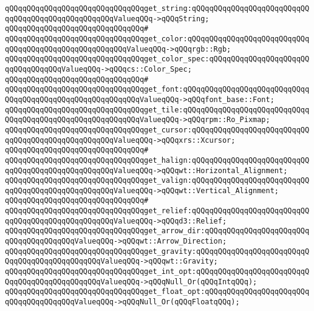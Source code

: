 \verb|qQQqqQQqqQQqqQQqqQQqqQQqqQQqqQQqget_string:qQQqqQQqqQQqqQQqqQQqqQQqqQQqqQQqqQQqqQQqqQQqqQQqqQQqValueqQQq->qQQqString;|\newline
\verb|qQQqqQQqqQQqqQQqqQQqqQQqqQQqqQQq#|\newline
\verb|qQQqqQQqqQQqqQQqqQQqqQQqqQQqqQQqget_color:qQQqqQQqqQQqqQQqqQQqqQQqqQQqqQQqqQQqqQQqqQQqqQQqqQQqqQQqValueqQQq->qQQqrgb::Rgb;|\newline
\verb|qQQqqQQqqQQqqQQqqQQqqQQqqQQqqQQqget_color_spec:qQQqqQQqqQQqqQQqqQQqqQQqqQQqqQQqqQQqValueqQQq->qQQqcs::Color_Spec;|\newline
\verb|qQQqqQQqqQQqqQQqqQQqqQQqqQQqqQQq#|\newline
\verb|qQQqqQQqqQQqqQQqqQQqqQQqqQQqqQQqget_font:qQQqqQQqqQQqqQQqqQQqqQQqqQQqqQQqqQQqqQQqqQQqqQQqqQQqqQQqqQQqValueqQQq->qQQqfont_base::Font;|\newline
\verb|qQQqqQQqqQQqqQQqqQQqqQQqqQQqqQQqget_tile:qQQqqQQqqQQqqQQqqQQqqQQqqQQqqQQqqQQqqQQqqQQqqQQqqQQqqQQqqQQqValueqQQq->qQQqrpm::Ro_Pixmap;|\newline
\verb|qQQqqQQqqQQqqQQqqQQqqQQqqQQqqQQqget_cursor:qQQqqQQqqQQqqQQqqQQqqQQqqQQqqQQqqQQqqQQqqQQqqQQqqQQqValueqQQq->qQQqxrs::Xcursor;|\newline
\verb|qQQqqQQqqQQqqQQqqQQqqQQqqQQqqQQq#|\newline
\verb|qQQqqQQqqQQqqQQqqQQqqQQqqQQqqQQqget_halign:qQQqqQQqqQQqqQQqqQQqqQQqqQQqqQQqqQQqqQQqqQQqqQQqqQQqValueqQQq->qQQqwt::Horizontal_Alignment;|\newline
\verb|qQQqqQQqqQQqqQQqqQQqqQQqqQQqqQQqget_valign:qQQqqQQqqQQqqQQqqQQqqQQqqQQqqQQqqQQqqQQqqQQqqQQqqQQqValueqQQq->qQQqwt::Vertical_Alignment;|\newline
\verb|qQQqqQQqqQQqqQQqqQQqqQQqqQQqqQQq#|\newline
\verb|qQQqqQQqqQQqqQQqqQQqqQQqqQQqqQQqget_relief:qQQqqQQqqQQqqQQqqQQqqQQqqQQqqQQqqQQqqQQqqQQqqQQqqQQqValueqQQq->qQQqd3::Relief;|\newline
\verb|qQQqqQQqqQQqqQQqqQQqqQQqqQQqqQQqget_arrow_dir:qQQqqQQqqQQqqQQqqQQqqQQqqQQqqQQqqQQqqQQqValueqQQq->qQQqwt::Arrow_Direction;|\newline
\verb|qQQqqQQqqQQqqQQqqQQqqQQqqQQqqQQqget_gravity:qQQqqQQqqQQqqQQqqQQqqQQqqQQqqQQqqQQqqQQqqQQqqQQqValueqQQq->qQQqwt::Gravity;|\newline
\newline
\verb|qQQqqQQqqQQqqQQqqQQqqQQqqQQqqQQqget_int_opt:qQQqqQQqqQQqqQQqqQQqqQQqqQQqqQQqqQQqqQQqqQQqqQQqValueqQQq->qQQqNull_Or(qQQqIntqQQq);|\newline
\verb|qQQqqQQqqQQqqQQqqQQqqQQqqQQqqQQqget_float_opt:qQQqqQQqqQQqqQQqqQQqqQQqqQQqqQQqqQQqqQQqValueqQQq->qQQqNull_Or(qQQqFloatqQQq);|\newline
